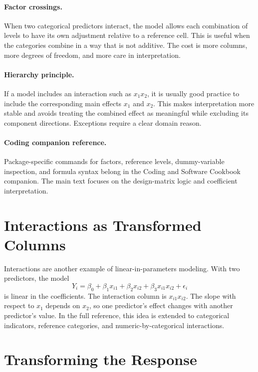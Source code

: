 {\paragraph{Factor crossings.}
When two categorical predictors interact, the model allows each combination of levels to have its own adjustment relative to a reference cell.  This is useful when the categories combine in a way that is not additive.  The cost is more columns, more degrees of freedom, and more care in interpretation.

\paragraph{Hierarchy principle.}
If a model includes an interaction such as \(x_1x_2\), it is usually good practice to include the corresponding main effects \(x_1\) and \(x_2\).  This makes interpretation more stable and avoids treating the combined effect as meaningful while excluding its component directions.  Exceptions require a clear domain reason.

\paragraph{Coding companion reference.}
Package-specific commands for factors, reference levels, dummy-variable inspection, and formula syntax belong in the Coding and Software Cookbook companion.  The main text focuses on the design-matrix logic and coefficient interpretation.

}{
\section{Interactions as Transformed Columns}

Interactions are another example of linear-in-parameters modeling.  With two predictors, the model
\begin{equation}
  Y_i=\beta_0+\beta_1x_{i1}+\beta_2x_{i2}+\beta_3x_{i1}x_{i2}+\epsilon_i
\end{equation}
is linear in the coefficients.  The interaction column is \(x_{i1}x_{i2}\).  The slope with respect to \(x_1\) depends on \(x_2\), so one predictor's effect changes with another predictor's value.  In the full reference, this idea is extended to categorical indicators, reference categories, and numeric-by-categorical interactions.
}

\section{Transforming the Response}

